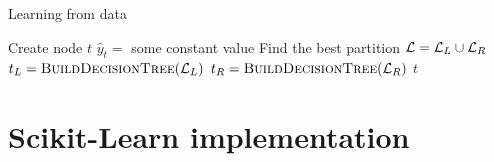 \documentclass{beamer}
\begin{document}
\begin{frame}[fragile]{Learning from data}

\begin{algorithmic}
    \State Create node $t$
        \State $\widehat{y}_{t} =$ some constant value
    \Else
        \State Find the best partition ${\cal L} = {\cal L}_{L} \cup {\cal L}_{R}$
        \State $t_L = \Call{BuildDecisionTree}{{\cal L}_{L}}$
        \State $t_R = \Call{BuildDecisionTree}{{\cal L}_{R}}$
    \EndIf
    \State \Return $t$
\EndFunction
\end{algorithmic}

\end{frame}


\section{Scikit-Learn implementation}
\end{document}
